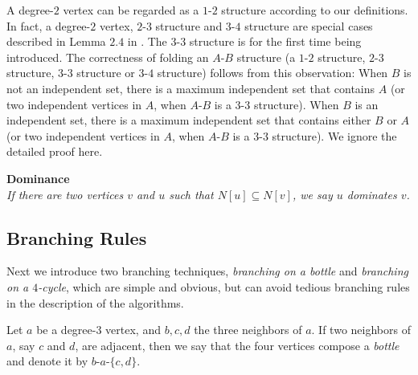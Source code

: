 \documentclass[runningheads]{llncs}
\begin{document}

A degree-$2$ vertex can be regarded as a $1$-$2$ structure
according to our definitions. In fact, a degree-$2$ vertex,
$2$-$3$ structure and $3$-$4$ structure are special cases
described in Lemma $2.4$ in \cite{VC2005}. The $3$-$3$ structure
is for the first time being introduced. The correctness of folding
an $A$-$B$ structure (a $1$-$2$ structure, $2$-$3$ structure,
$3$-$3$ structure or $3$-$4$ structure) follows from this
observation: When $B$ is not an independent set, there is a
maximum independent set that contains $A$ (or two independent
vertices in $A$, when $A$-$B$ is a $3$-$3$ structure). When $B$ is
an independent set, there is a maximum independent set that
contains either $B$ or $A$ (or two independent vertices in $A$,
when $A$-$B$ is a $3$-$3$ structure). We ignore the detailed proof
here.

\vspace{2mm}\noindent \textbf{Dominance}\\
\emph{If there are two vertices $v$ and $u$ such that
$N[u]\subseteq N[v]$, we say $u$ dominates $v$.} 


\subsection{Branching Rules}

Next we introduce two branching techniques, \emph{branching on a
bottle} and \emph{branching on a $4$-cycle}, which are simple and
obvious, but can  avoid tedious branching rules in the description
of the algorithms.

Let $a$ be a degree-$3$ vertex, and $b,c,d$ the three neighbors of
$a$. If two neighbors of $a$, say $c$ and $d$, are adjacent, then
we say that the four vertices compose a \emph{bottle} and denote
it by $b$-$a$-$\{c,d\}$.
\end{document}
